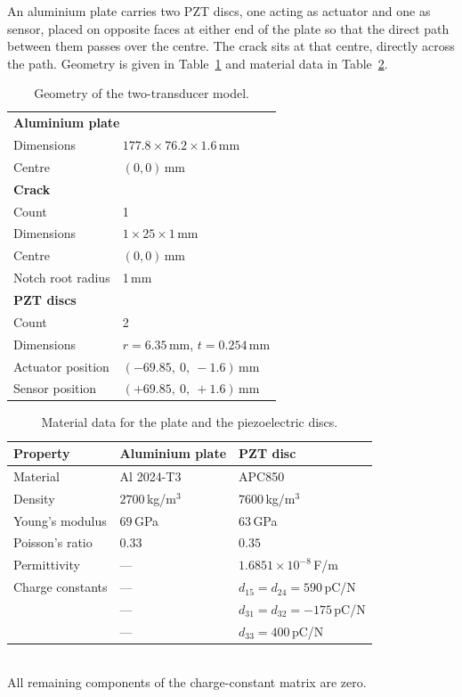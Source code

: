 An aluminium plate carries two PZT discs, one acting as actuator and one as sensor, placed on opposite faces
at either end of the plate so that the direct path between them passes over the centre. The crack sits at that
centre, directly across the path. Geometry is given in Table~\ref{tab:geom2} and material data in
Table~\ref{tab:mat2}.

\begin{table}[H]
\centering
\caption{Geometry of the two-transducer model.}
\begin{tabular}{l l}
\toprule
\multicolumn{2}{l}{\textbf{Aluminium plate}}\\
Dimensions & $177.8 \times 76.2 \times 1.6$\,mm \\
Centre & $(0,0)$\,mm \\
\midrule
\multicolumn{2}{l}{\textbf{Crack}}\\
Count & 1 \\
Dimensions & $1 \times 25 \times 1$\,mm \\
Centre & $(0,0)$\,mm \\
Notch root radius & 1\,mm \\
\midrule
\multicolumn{2}{l}{\textbf{PZT discs}}\\
Count & 2 \\
Dimensions & $r = 6.35$\,mm, $t = 0.254$\,mm \\
Actuator position & $(-69.85,\ 0,\ -1.6)$\,mm \\
Sensor position & $(+69.85,\ 0,\ +1.6)$\,mm \\
\bottomrule
\end{tabular}
\label{tab:geom2}
\end{table}

\begin{table}[H]
\centering
\caption{Material data for the plate and the piezoelectric discs.}
\begin{tabular}{l l l}
\toprule
Property & Aluminium plate & PZT disc \\
\midrule
Material          & Al 2024-T3 & APC850 \\
Density           & $2700$\,kg/m$^3$ & $7600$\,kg/m$^3$ \\
Young's modulus   & $69$\,GPa & $63$\,GPa \\
Poisson's ratio   & $0.33$ & $0.35$ \\
Permittivity      & --- & $1.6851\times10^{-8}$\,F/m \\
Charge constants  & --- & $d_{15}=d_{24}=590$\,pC/N \\
                  & --- & $d_{31}=d_{32}=-175$\,pC/N \\
                  & --- & $d_{33}=400$\,pC/N \\
\bottomrule
\end{tabular}\\[4pt]
{\small All remaining components of the charge-constant matrix are zero.}
\label{tab:mat2}
\end{table}

